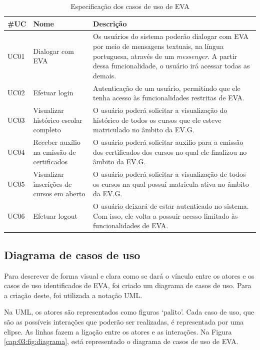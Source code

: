 \begin{table}[htb!]
\caption{Especificação dos casos de uso de EVA}
\label{tabela:tabela4}
\center
\footnotesize
\begin{tabular}{|p{2cm}|p{3cm}|p{7.5cm}|}
  \hline
   \textbf{\#UC} & \textbf{Nome}  & \textbf{Descrição}  \\
   \hline
    UC01 & Dialogar com EVA & Os usuários do sistema poderão dialogar com EVA por meio de mensagens textuais, na língua portuguesa, através de um \textit{messenger}. A partir dessa funcionalidade, o usuário irá acessar todas as demais.\\
   \hline
    UC02 & Efetuar login & Autenticação de um usuário, permitindo que ele tenha acesso às funcionalidades restritas de EVA. \\
   \hline
    UC03 & Visualizar histórico escolar completo & O usuário poderá solicitar a visualização do histórico de todos os cursos que ele esteve matriculado no âmbito da EV.G. \\
   \hline
    UC04 & Receber auxílio na emissão de certificados & O usuário poderá solicitar auxilio para a emissão dos certificados dos cursos no qual ele finalizou no âmbito da EV.G. \\
   \hline
    UC05 & Visualizar inscrições de cursos em aberto & O usuário poderá solicitar a visualização de todos os cursos na qual possui matricula ativa no âmbito da EV.G. \\
   \hline
    UC06 & Efetuar logout & O usuário deixará de estar autenticado no sistema. Com isso, ele volta a possuir acesso limitado às funcionalidades de EVA.\\
   \hline
\end{tabular}
\end{table}

\subsection{Diagrama de casos de uso}

Para descrever de forma visual e clara como se dará o vínculo entre os atores e os casos de uso identificados de EVA, foi criado um diagrama de casos de uso. Para a criação deste, foi utilizada a notação UML.

Na UML, os atores são representados como figuras ‘palito’. Cada caso de uso, que são as possíveis interações que poderão ser realizadas, é representada por uma elipse. As linhas fazem a ligação entre os atores e as interações. Na Figura \ref{cap:03:fig:diagrama}, está representado o diagrama de casos de uso de EVA.

